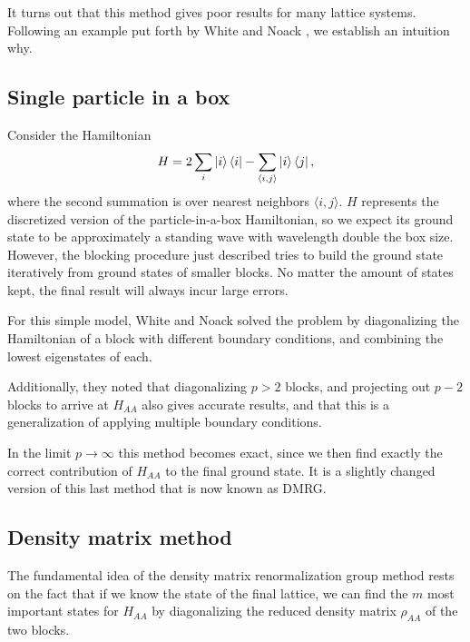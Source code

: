 It turns out that this method gives poor results for many lattice systems. Following an
example put forth by White and Noack \cite{white1992real}, we establish an intuition
why.

\subsection{Single particle in a box}

Consider the Hamiltonian
\begin{equation}
  H = 2 \sum_i \ket{i}\bra{i} - \sum_{\langle i, j \rangle} \ket{i}\bra{j},
\end{equation}
where the second summation is over nearest neighbors $\langle i,
j \rangle$. $H$ represents the discretized version of the
particle-in-a-box Hamiltonian, so we expect its ground state to be
approximately a standing wave with wavelength double the box size.
However, the blocking procedure just described tries to build the ground
state iteratively from ground states of smaller blocks. No matter the
amount of states kept, the final result will always incur large errors.

For this simple model, White and Noack solved the problem by diagonalizing
the Hamiltonian of a block with different boundary conditions, and
combining the lowest eigenstates of each.

Additionally, they noted that
diagonalizing $p > 2$ blocks, and projecting out $p - 2$ blocks to arrive
at $H_{AA}$ also gives accurate results, and that this is a generalization
of applying multiple boundary conditions. 

In the limit $p \to \infty$
this method becomes exact, since we then find exactly the correct
contribution of $H_{AA}$ to the final ground state. It is a slightly
changed version of this last method that is now known as DMRG.

\subsection{Density matrix method}

The fundamental idea of the density matrix renormalization group method
rests on the fact that if we know the state of the final lattice, we can find the $m$
most important states for $H_{AA}$ by diagonalizing the reduced density
matrix $\rho_{AA}$ of the two blocks.


